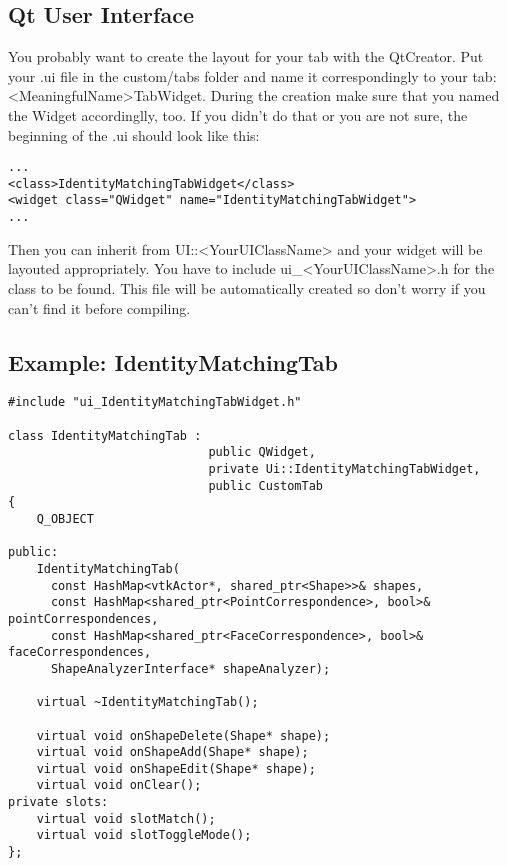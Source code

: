 \subsection{Qt User Interface}
\label{subsec:QtUI}

You probably want to create the layout for your tab with the QtCreator. Put your .ui file in the custom/tabs folder and name it correspondingly to your tab: <MeaningfulName>TabWidget. During the creation make sure that you named the Widget accordinglly, too. If you didn't do that or you are not sure, the beginning of the .ui should look like this: 

\begin{lstlisting}[style=lstStyleCpp, caption={IdentityMatchingTabWidget.ui}]
...
<class>IdentityMatchingTabWidget</class>
<widget class="QWidget" name="IdentityMatchingTabWidget">
...
\end{lstlisting}

Then you can inherit from UI::<YourUIClassName> and your widget will be layouted appropriately. You have to include ui\_<YourUIClassName>.h for the class to be found. This file will be automatically created so don't worry if you can't find it before compiling. 


\subsection{Example: IdentityMatchingTab}
\label{subsec:ExampleIdentityMatchingTab}

\begin{lstlisting}[style=lstStyleCpp, caption={IdentityMatchingTab.h}]
#include "ui_IdentityMatchingTabWidget.h"

class IdentityMatchingTab : 
                            public QWidget, 
                            private Ui::IdentityMatchingTabWidget, 
                            public CustomTab 
{
    Q_OBJECT
    
public:
    IdentityMatchingTab(
      const HashMap<vtkActor*, shared_ptr<Shape>>& shapes,
      const HashMap<shared_ptr<PointCorrespondence>, bool>& pointCorrespondences,
      const HashMap<shared_ptr<FaceCorrespondence>, bool>& faceCorrespondences,
      ShapeAnalyzerInterface* shapeAnalyzer);
    
    virtual ~IdentityMatchingTab();
    
    virtual void onShapeDelete(Shape* shape);
    virtual void onShapeAdd(Shape* shape);
    virtual void onShapeEdit(Shape* shape);
    virtual void onClear();
private slots:
    virtual void slotMatch();
    virtual void slotToggleMode();
};
\end{lstlisting}

